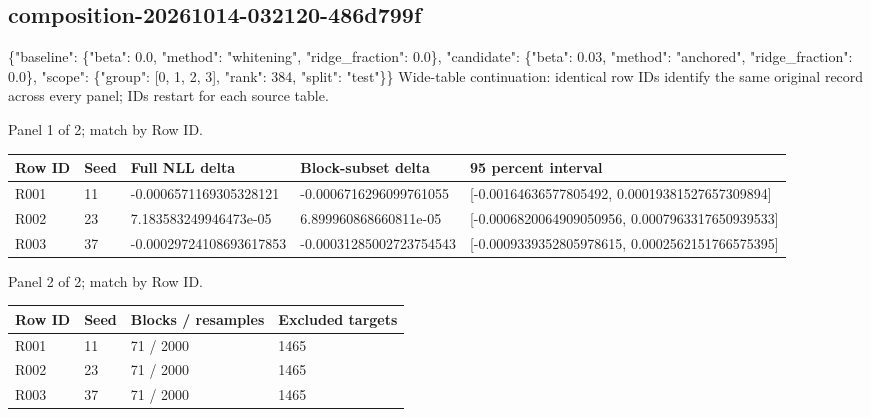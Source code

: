 \documentclass[10pt]{article}
\begin{document}
\subsection{composition-20261014-032120-486d799f}
\{"baseline": \{"beta": 0.0, "method": "whitening", "ridge\_fraction": 0.0\}, "candidate": \{"beta": 0.03, "method": "anchored", "ridge\_fraction": 0.0\}, "scope": \{"group": [0, 1, 2, 3], "rank": 384, "split": "test"\}\}
Wide-table continuation: identical row IDs identify the same original record across every panel; IDs restart for each source table.
\par\noindent Panel 1 of 2; match by Row ID.
{\scriptsize\setlength{\tabcolsep}{2pt}
\begin{longtable}{p{}p{}p{}p{}p{}}
Row ID & Seed & Full NLL delta & Block-subset delta & 95 percent interval \\
\hline\endhead
R001 & 11 & -0.0006571169305328121 & -0.0006716296099761055 & [-0.00164636577805492, 0.00019381527657309894] \\
R002 & 23 & 7.183583249946473e-05 & 6.899960868660811e-05 & [-0.0006820064909050956, 0.0007963317650939533] \\
R003 & 37 & -0.00029724108693617853 & -0.00031285002723754543 & [-0.0009339352805978615, 0.0002562151766575395] \\
\end{longtable}}
\par\noindent Panel 2 of 2; match by Row ID.
{\scriptsize\setlength{\tabcolsep}{2pt}
\begin{longtable}{p{}p{}p{}p{}}
Row ID & Seed & Blocks / resamples & Excluded targets \\
\hline\endhead
R001 & 11 & 71 / 2000 & 1465 \\
R002 & 23 & 71 / 2000 & 1465 \\
R003 & 37 & 71 / 2000 & 1465 \\
\end{longtable}}
\end{document}
